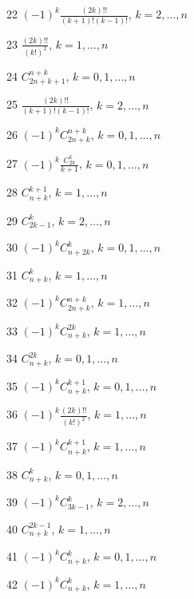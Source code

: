 \documentclass[11pt, russian]{article}
\begin{document}
22 
$(-1)^{k}\frac{(2k)!!}{(k+1)!(k-1)!}$, $k=2,\ldots,n$\par

23 
$\frac{(2k)!!}{(k!)^2}$, $k=1,\ldots,n$\par

24 
$C_{2n+k+1}^{n+k}$, $k=0,1,\ldots,n$\par

25 
$\frac{(2k)!!}{(k+1)!(k-1)!}$, $k=2,\ldots,n$\par

26 
$(-1)^{k}C_{2n+k}^{n+k}$, $k=0,1,\ldots,n$\par

27 
$(-1)^{k}\frac{C_{2k}^k}{k+1}$, $k=0,1,\ldots,n$\par

28 
$C_{n+k}^{k+1}$, $k=1,\ldots,n$\par

29 
$C_{2k-1}^{k}$, $k=2,\ldots,n$\par

30 
$(-1)^{k}C_{n+2k}^{k}$, $k=0,1,\ldots,n$\par

31 
$C_{n+k}^{k}$, $k=1,\ldots,n$\par

32 
$(-1)^{k}C_{2n+k}^{n+k}$, $k=1,\ldots,n$\par

33 
$(-1)^{k}C_{n+k}^{2k}$, $k=1,\ldots,n$\par

34 
$C_{n+k}^{2k}$, $k=0,1,\ldots,n$\par

35 
$(-1)^{k}C_{n+k}^{k+1}$, $k=0,1,\ldots,n$\par

36 
$(-1)^{k}\frac{(2k)!!}{(k!)^2}$, $k=1,\ldots,n$\par

37 
$(-1)^{k}C_{n+k}^{k+1}$, $k=1,\ldots,n$\par

38 
$C_{n+k}^{k}$, $k=0,1,\ldots,n$\par

39 
$(-1)^{k}C_{3k-1}^{k}$, $k=2,\ldots,n$\par

40 
$C_{n+k}^{2k-1}$, $k=1,\ldots,n$\par

41 
$(-1)^{k}C_{n+k}^{k}$, $k=0,1,\ldots,n$\par

42 
$(-1)^{k}C_{n+k}^{k}$, $k=1,\ldots,n$\par
\end{document}
